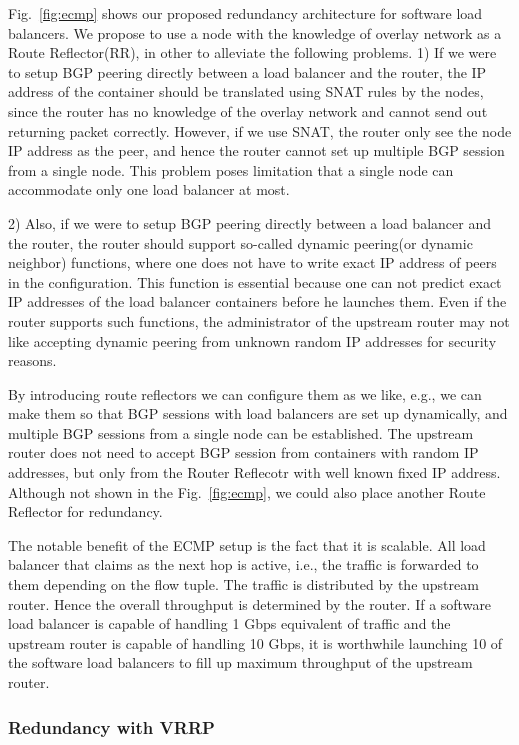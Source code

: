 Fig.~\ref{fig:ecmp} shows our proposed redundancy architecture for software load balancers.
%
We propose to use a node with the knowledge of overlay network as a Route Reflector(RR), in other to alleviate the following problems.
1) If we were to setup BGP peering directly between a load balancer and the router, the IP address of the container should be translated using SNAT rules by the nodes, since the router has no knowledge of the overlay network and cannot send out returning packet correctly.
However, if we use SNAT, the router only see the node IP address as the peer, and hence the router cannot set up multiple BGP session from a single node.
This problem poses limitation that a single node can accommodate only one load balancer at most.

2) Also, if we were to setup BGP peering directly between a load balancer and the router, the router should support so-called dynamic peering(or dynamic neighbor) functions, where one does not have to write exact IP address of peers in the configuration.
This function is essential because one can not predict exact IP addresses of the load balancer containers before he launches them.
Even if the router supports such functions, the administrator of the upstream router may not like accepting dynamic peering from unknown random IP addresses for security reasons.

By introducing route reflectors we can configure them as we like, e.g., we can make them so that BGP sessions with load balancers are set up dynamically, and multiple BGP sessions from a single node can be established.
The upstream router does not need to accept BGP session from containers with random IP addresses, but only from the Router Reflecotr with well known fixed IP address.
Although not shown in the Fig.~\ref{fig:ecmp}, we could also place another Route Reflector for redundancy.

The notable benefit of the ECMP setup is the fact that it is scalable.
All load balancer that claims as the next hop is active, i.e., the traffic is forwarded to them depending on the flow tuple.
The traffic is distributed by the upstream router. Hence the overall throughput is determined by the router.
If a software load balancer is capable of handling 1 Gbps equivalent of traffic and the upstream router is capable of handling 10 Gbps, it is worthwhile launching 10 of the software load balancers to fill up maximum throughput of the upstream router.

\subsubsection{Redundancy with VRRP}

